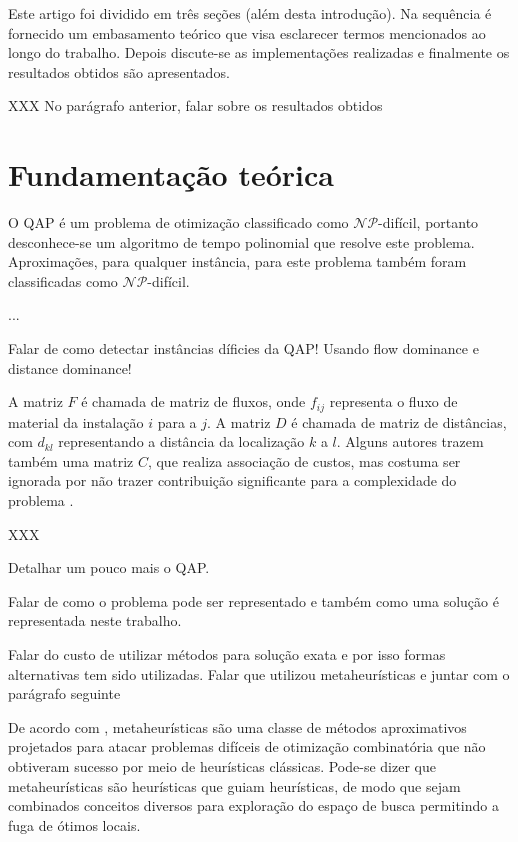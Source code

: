 Este artigo foi dividido em três seções (além desta introdução). Na
sequência é fornecido um embasamento teórico que visa esclarecer
termos mencionados ao longo do trabalho. Depois discute-se as
implementações realizadas e finalmente os resultados obtidos são
apresentados.

XXX No parágrafo anterior, falar sobre os resultados obtidos


\section{Fundamentação teórica}
\label{sec:fund}

O QAP é um problema de otimização classificado como
$\mathcal{NP}$-difícil,
portanto desconhece-se um algoritmo de tempo polinomial que resolve
este problema. Aproximações, para qualquer instância, para este
problema também foram classificadas como $\mathcal{NP}$-difícil.

...

Falar de como detectar instâncias díficies da QAP! Usando flow
dominance e distance dominance!


A matriz $F$ é chamada de matriz de fluxos, onde $f_{ij}$ representa o
fluxo de material da instalação $i$ para a $j$. A matriz $D$ é chamada
de matriz de distâncias, com $d_{kl}$ representando a distância da
localização $k$ a $l$. Alguns autores trazem também uma matriz $C$,
que realiza associação de custos, mas costuma ser ignorada por não
trazer contribuição significante para a complexidade do  problema
\cite{QACO}.

XXX

Detalhar um pouco mais o QAP.

Falar de como o problema pode ser representado e também como uma
solução é representada neste trabalho.

Falar do custo de utilizar métodos para solução exata e
por isso formas alternativas tem sido utilizadas.
Falar que utilizou metaheurísticas e juntar com o parágrafo seguinte

De acordo com \cite{metatheory}, metaheurísticas são uma
classe de métodos aproximativos projetados para atacar problemas
difíceis de otimização combinatória que não obtiveram sucesso por meio
de heurísticas clássicas. Pode-se dizer que metaheurísticas são
heurísticas que guiam heurísticas, de modo que sejam combinados
conceitos diversos para exploração do espaço de busca permitindo a
fuga de ótimos locais.

